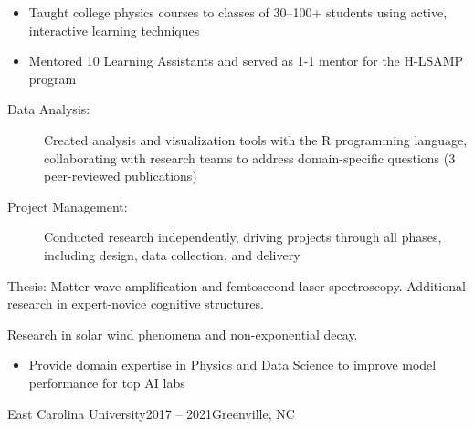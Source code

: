 \documentclass[10pt,letterpaper,ragged2e,withhyper,normalphoto]{altacv}
\begin{document}
\divider

\begin{itemize}
\item Taught college physics courses to classes of 30--100+ students
  using active, interactive learning techniques
\item Mentored 10 Learning Assistants and served as 1-1 mentor for the
  H-LSAMP program
\end{itemize}

\divider

\begin{description}
\item[Data Analysis:] Created analysis and visualization tools with
  the R programming language, collaborating with research teams to
  address domain-specific questions (3 peer-reviewed publications)
\item[Project Management:] Conducted research independently, driving
  projects through all phases, including design, data collection, and
  delivery
\end{description}


 Thesis: Matter-wave amplification and
femtosecond laser spectroscopy. Additional research in expert-novice
cognitive structures.

 Research in solar wind phenomena and non-exponential decay.



\begin{itemize}
\item Provide domain expertise in Physics and Data Science to improve
  model performance for top AI labs
\end{itemize}

 {East Carolina
  University}{2017 -- 2021}{Greenville, NC}
\end{document}
